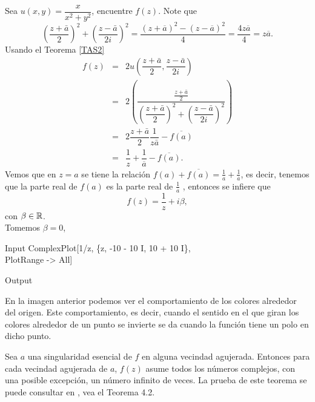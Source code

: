 \begin{Ejem}
	Sea $u(x,y)=\dfrac{x}{x^2+y^2}$, encuentre $f(z)$.
	\solu Note que 
	$$\left(\dfrac{z+\bar{a}}{2}\right)^{2}+\left(\dfrac{z-\bar{a}}{2i}\right)^2=\dfrac{(z+\overline{a})^2-(z-\overline{a})^2}{4}=\dfrac{4z\overline{a}}{4}=z\overline{a}.$$
	Usando el Teorema \ref{TAS2}
	\[
		\begin{array}{ccl}
			f(z)&=&2u\left(\dfrac{z+\bar{a}}{2},\dfrac{z-\bar{a}}{2i}\right)\\
			&=&2\left(\dfrac{\frac{z+\bar{a}}{2}}{\left(\dfrac{z+\bar{a}}{2}\right)^{2}+\left(\dfrac{z-\bar{a}}{2i}\right)^2}\right)\\
			&=&2\dfrac{z+\bar{a}}{2}\dfrac{1}{z\bar{a}}-\overline{f(a)}\\
			&=&\dfrac{1}{z}+\dfrac{1}{\overline{a}}-\overline{f(a)}.
		\end{array}
	\]
	Vemos que en $z = a$ se tiene la relación $f(a)+\overline{f(a)}=\frac{1}{a}+\frac{1}{\overline{a}}$, es decir, tenemos  que la parte real de $f(a)$ es la parte real de $\frac{1}{\overline{a}}$ , entonces se infiere que
	$$f(z)=\dfrac{1}{z}+i\beta,$$
	con $\beta\in\mathbb{R}$.\\Tomemos $\beta=0$,
	\begin{mmaCell}{Input}
		ComplexPlot[1/z, \{z, -10 - 10 I, 10 + 10 I\},\\PlotRange -> All]
	\end{mmaCell}
	
	\begin{mmaCell}[moregraphics={moreig={scale=.25}}]{Output}
	\end{mmaCell}
En la imagen anterior podemos ver el comportamiento de los colores alrededor del origen. Este comportamiento, es decir, cuando el sentido en el que giran los colores alrededor de un punto se invierte se da cuando la función tiene un polo en dicho punto. \endproof
\end{Ejem}
\begin{teor}\label{GTP}
	Sea $a$ una singularidad esencial de $f$ en alguna vecindad agujerada. Entonces para cada vecindad agujerada de $a$, $f(z)$ asume todos los números complejos, con una posible excepción, un número infinito de veces.
	La prueba de este teorema se puede consultar en \cite{Conway}, vea el Teorema 4.2.
\end{teor}
